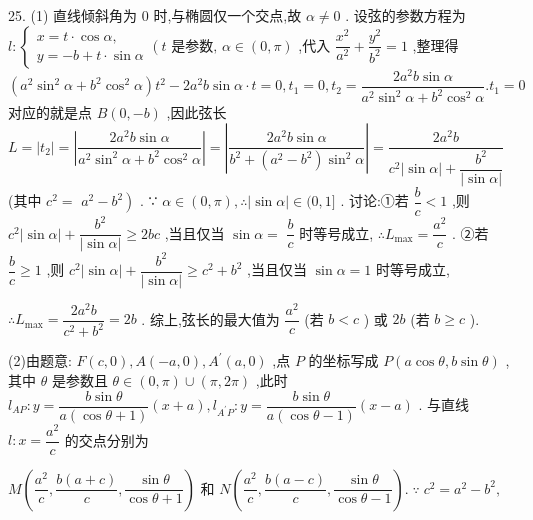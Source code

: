 25. (1) 直线倾斜角为 0 时,与椭圆仅一个交点,故 $\alpha  \neq  0$ . 设弦的参数方程为 $l : \left\{  {\begin{array}{l} x = t \cdot  \cos \alpha , \\  y =  - b + t \cdot  \sin \alpha  \end{array}\left( {t\text{ 是参数, }\alpha  \in  \left( {0,\pi }\right) }\right. }\right.$ ,代入 $\dfrac{{x}^{2}}{{a}^{2}} + \dfrac{{y}^{2}}{{b}^{2}} = 1$ ,整理得 $\left( {{a}^{2}{\sin }^{2}\alpha  + {b}^{2}{\cos }^{2}\alpha }\right) {t}^{2} - 2{a}^{2}b\sin \alpha  \cdot  t = 0,{t}_{1} = 0,{t}_{2} = \dfrac{2{a}^{2}b\sin \alpha }{{a}^{2}{\sin }^{2}\alpha  + {b}^{2}{\cos }^{2}\alpha }.{t}_{1} = 0$ 对应的就是点 $B\left( {0, - b}\right)$ ,因此弦长 $L = \left| {t}_{2}\right|  = \left| \dfrac{2{a}^{2}b\sin \alpha }{{a}^{2}{\sin }^{2}\alpha  + {b}^{2}{\cos }^{2}\alpha }\right|  = \left| \dfrac{2{a}^{2}b\sin \alpha }{{b}^{2} + \left( {{a}^{2} - {b}^{2}}\right) {\sin }^{2}\alpha }\right|  = \dfrac{2{a}^{2}b}{{c}^{2}\left| {\sin \alpha }\right|  + \dfrac{{b}^{2}}{\left| \sin \alpha \right| }}$ (其中 ${c}^{2} =$  $\left. {{a}^{2} - {b}^{2}}\right)$ . ∵ $\alpha  \in  \left( {0,\pi }\right) ,\therefore \left| {\sin \alpha }\right|  \in  (0,1\rbrack$ . 讨论:①若 $\dfrac{b}{c} < 1$ ,则 ${c}^{2}\left| {\sin \alpha }\right|  + \dfrac{{b}^{2}}{\left| \sin \alpha \right| } \geq  {2bc}$ ,当且仅当 $\sin \alpha  =$  $\dfrac{b}{c}$ 时等号成立, $\therefore {L}_{\max } = \dfrac{{a}^{2}}{c}$ . ②若 $\dfrac{b}{c} \geq  1$ ,则 ${c}^{2}\left| {\sin \alpha }\right|  + \dfrac{{b}^{2}}{\left| \sin \alpha \right| } \geq  {c}^{2} + {b}^{2}$ ,当且仅当 $\sin \alpha  = 1$ 时等号成立,

$\therefore {L}_{\max } = \dfrac{2{a}^{2}b}{{c}^{2} + {b}^{2}} = {2b}$ . 综上,弦长的最大值为 $\dfrac{{a}^{2}}{c}$ (若 $b < c$ ) 或 ${2b}$ (若 $b \geq  c$ ).

(2)由题意: $F\left( {c,0}\right) ,A\left( {-a,0}\right) ,{A}^{\prime }\left( {a,0}\right)$ ,点 $P$ 的坐标写成 $P\left( {a\cos \theta ,b\sin \theta }\right)$ ,其中 $\theta$ 是参数且 $\theta  \in  \left( {0,\pi }\right)  \cup  \left( {\pi ,{2\pi }}\right)$ ,此时 ${l}_{AP} : y = \dfrac{b\sin \theta }{a\left( {\cos \theta  + 1}\right) }\left( {x + a}\right) ,{l}_{{A}^{\prime }P} : y = \dfrac{b\sin \theta }{a\left( {\cos \theta  - 1}\right) }\left( {x - a}\right)$ . 与直线 $l : x = \dfrac{{a}^{2}}{c}$ 的交点分别为

$M\left( {\dfrac{{a}^{2}}{c},\dfrac{b\left( {a + c}\right) }{c},\dfrac{\sin \theta }{\cos \theta  + 1}}\right)$ 和 $N\left( {\dfrac{{a}^{2}}{c},\dfrac{b\left( {a - c}\right) }{c},\dfrac{\sin \theta }{\cos \theta  - 1}}\right) .\;\because \;{c}^{2} = {a}^{2} - {b}^{2},$

